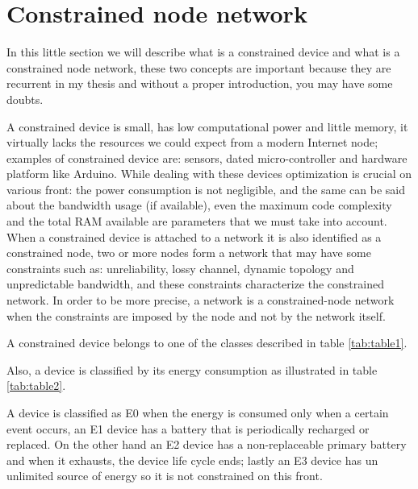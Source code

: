 	\section{Constrained node network}
	In this little section we will describe what is a constrained device and what is a constrained node network,
	these two concepts are important because they are recurrent in my thesis and without a proper introduction, you may have
	some doubts. \newline
	
	A constrained device is small, has low computational power and little memory, it virtually lacks the resources
	we could expect from a modern Internet node; examples of constrained device are: sensors, dated micro-controller and hardware platform like Arduino.\newline
	While dealing with these devices optimization is crucial on various front: the power consumption is not negligible,
	and the same can be said about the bandwidth usage (if available), even the maximum code complexity and the total RAM available are parameters that we must take into account.\newline
	When a constrained device is attached to a network it is also identified as a constrained node, two or more nodes form a network that may have some constraints such as: unreliability, lossy channel, dynamic topology and unpredictable bandwidth, and these constraints characterize the constrained network.\newline
	In order to be more precise, a network is a constrained-node network when the constraints are imposed by the node
	and not by the network itself.
	
	
	
	A constrained device belongs to one of the classes described in table \ref{tab:table1}.\newline
	
	
	Also, a device is classified by its energy consumption as illustrated in table \ref{tab:table2}.
	
	A device is classified as E0 when the energy is consumed only when a certain event occurs, an E1 device has a battery 
	that is periodically recharged or replaced.\newline
	On the other hand an E2 device has a non-replaceable primary battery and when it exhausts, the device life cycle ends; lastly an E3 device has un unlimited source of energy so it is not constrained on this front.\newline 
	
